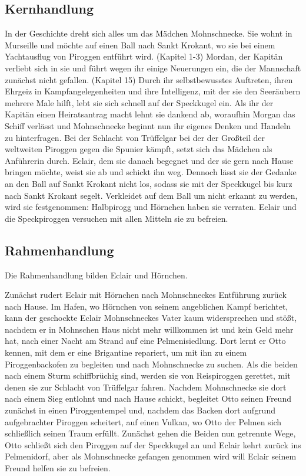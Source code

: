 \subsection{Kernhandlung}
In der Geschichte dreht sich alles um das Mädchen Mohnschnecke. Sie wohnt in Murseille und möchte auf einen Ball nach Sankt Krokant, wo sie bei einem Yachtausflug von Piroggen entführt wird. (Kapitel 1-3) Mordan, der Kapitän verliebt sich in sie und führt wegen ihr einige Neuerungen ein, die der Mannschaft zunächst nicht gefallen. (Kapitel 15) Durch ihr selbstbewusstes Auftreten, ihren Ehrgeiz in Kampfangelegenheiten und ihre Intelligenz, mit der sie den Seeräubern mehrere Male hilft, lebt sie sich schnell auf der Speckkugel ein. Als ihr der Kapitän einen Heiratsantrag macht lehnt sie dankend ab, woraufhin Morgan das Schiff verlässt und Mohnschnecke beginnt nun ihr eigenes Denken und Handeln zu hinterfragen. Bei der Schlacht von Trüffelgar bei der der Großteil der weltweiten Piroggen gegen die Spunier kämpft, setzt sich das Mädchen als Anführerin durch. Eclair, dem sie danach begegnet und der sie gern nach Hause bringen möchte, weist sie ab und schickt ihn weg. Dennoch lässt sie der Gedanke an den Ball auf Sankt Krokant nicht los, sodass sie mit der Speckkugel bis kurz nach Sankt Krokant segelt. Verkleidet auf dem Ball um nicht erkannt zu werden, wird sie festgenommen: Halbpirogg und Hörnchen haben sie verraten. Eclair und die Speckpiroggen versuchen mit allen Mitteln sie zu befreien.

\subsection{Rahmenhandlung}

Die Rahmenhandlung bilden Eclair und Hörnchen.

Zunächst rudert Eclair mit Hörnchen nach Mohnschneckes Entführung zurück nach Hause. Im Hafen, wo Hörnchen von seinem angeblichen Kampf berichtet, kann der geschockte Eclair Mohnschneckes Vater kaum widersprechen und stößt, nachdem er in Mohnschen Haus nicht mehr willkommen ist und kein Geld mehr hat, nach einer Nacht am Strand auf eine Pelmenisiedlung. Dort lernt er Otto kennen, mit dem er eine Brigantine repariert, um mit ihn zu einem Piroggenbackofen zu begleiten und nach Mohnschnecke zu suchen. Als die beiden nach einem Sturm schiffbrüchig sind, werden sie von Reispiroggen gerettet, mit denen sie zur Schlacht von Trüffelgar fahren. Nachdem Mohnschnecke sie dort nach einem Sieg entlohnt und nach Hause schickt, begleitet Otto seinen Freund zunächst in einen Piroggentempel und, nachdem das Backen dort aufgrund aufgebrachter Piroggen scheitert, auf einen Vulkan, wo Otto der Pelmen sich schließlich seinen Traum erfüllt. Zunächst gehen die Beiden nun getrennte Wege, Otto schließt sich den Piroggen auf der Speckkugel an und Eclair kehrt zurück ins Pelmenidorf, aber als Mohnschnecke gefangen genommen wird will Eclair seinem Freund helfen sie zu befreien.

